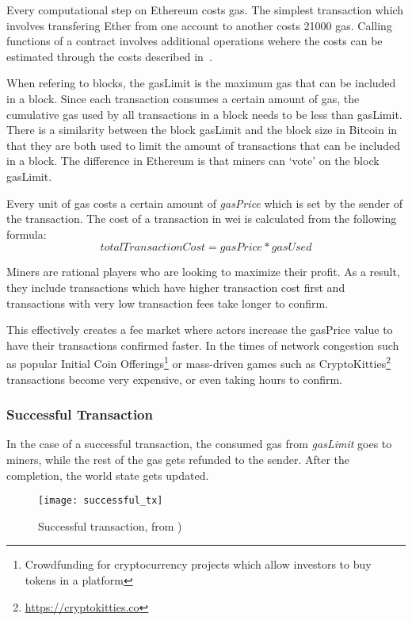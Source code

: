 Every computational step on Ethereum costs gas. The simplest transaction which involves transfering Ether from one account to another costs 21000 gas. Calling functions of a contract involves additional operations wehere the costs can be estimated through the costs described in~\cite{gas, ethereum}. 

When refering to blocks, the gasLimit is the maximum gas that can be included in a block. Since each transaction consumes a certain amount of gas, the cumulative gas used by all transactions in a block needs to be less than gasLimit. There is a similarity between the block gasLimit and the block size in Bitcoin in that they are both used to limit the amount of transactions that can be included in a block. The difference in Ethereum is that miners can `vote' on the block gasLimit.

Every unit of gas costs a certain amount of \textit{gasPrice} which is set by the sender of the transaction. The cost of a transaction in wei is calculated from the following formula:
\begin{equation}
    totalTransactionCost = gasPrice * gasUsed
\end{equation}

Miners are rational players who are looking to maximize their profit. As a result, they include transactions which have higher transaction cost first and transactions with very low transaction fees take longer to confirm.

This effectively creates a fee market  where actors increase the gasPrice value to have their transactions confirmed faster. In the times of network congestion such as popular Initial Coin Offerings\footnote{Crowdfunding for cryptocurrency projects which allow investors to buy tokens in a platform}\cite{batico} or mass-driven games such as CryptoKitties\footnote{\url{https://cryptokitties.co}}\cite{cryptokitties} transactions become very expensive, or even taking hours to confirm.

\subsubsection{Successful Transaction}
In the case of a successful transaction, the consumed gas from \textit{gasLimit} goes to miners, while the rest of the gas gets refunded to the sender. After the completion, the world state gets updated.

\begin{figure}[H]
    \centering
    \texttt{[image: successful\_tx]}
    \caption{Successful transaction, from \cite{preethi})}
    \label{fig:successful_tx}
\end{figure}

